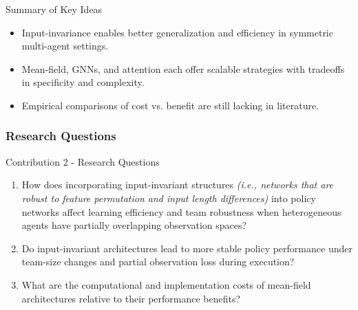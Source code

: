 \begin{frame}{Summary of Key Ideas}
\begin{itemize}
    \item Input-invariance enables better generalization and efficiency in symmetric multi-agent settings.
    \item Mean-field, GNNs, and attention each offer scalable strategies with tradeoffs in specificity and complexity.
    \item Empirical comparisons of cost vs. benefit are still lacking in literature.%
\end{itemize}
\end{frame}

\subsubsection{Research Questions}

\begin{frame}{Contribution 2 - Research Questions}
    \begin{enumerate}
        \item[RQ 1] {
            How does incorporating input-invariant structures \emph{(i.e., networks 
            that are robust to feature permutation and input length differences)}
            into policy networks affect learning efficiency and team robustness 
            when heterogeneous agents have partially overlapping observation spaces?
            }
        \item[RQ 2] {
            Do input-invariant architectures lead to more stable policy performance under 
            team-size changes and partial observation loss during execution?
            }
        \item[RQ 3] {
            What are the computational and implementation costs of mean-field
            architectures relative to their performance benefits?
            }
    \end{enumerate}
\end{frame}

